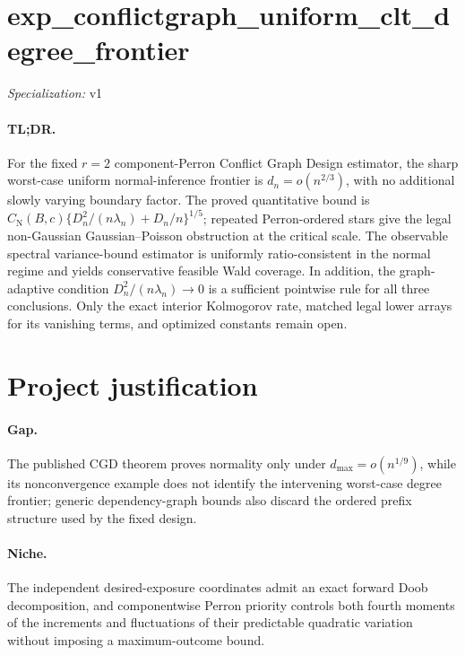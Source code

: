 \documentclass{article}
\begin{document}
\sloppy

\section*{exp\_\allowbreak{}conflictgraph\_\allowbreak{}uniform\_\allowbreak{}clt\_\allowbreak{}degree\_\allowbreak{}frontier}

\noindent\textit{Specialization:} v1\par

\paragraph{TL;DR.} For the fixed \(r=2\) component-Perron Conflict Graph Design estimator, the sharp worst-case uniform normal-inference frontier is \(d_n=o(n^{2/3})\), with no additional slowly varying boundary factor. The proved quantitative bound is \(C_{\mathrm N}(B,c)\{D_n^2/(n\lambda_n)+D_n/n\}^{1/5}\); repeated Perron-ordered stars give the legal non-Gaussian Gaussian--Poisson obstruction at the critical scale. The observable spectral variance-bound estimator is uniformly ratio-consistent in the normal regime and yields conservative feasible Wald coverage. In addition, the graph-adaptive condition \(D_n^2/(n\lambda_n)\to0\) is a sufficient pointwise rule for all three conclusions. Only the exact interior Kolmogorov rate, matched legal lower arrays for its vanishing terms, and optimized constants remain open.

\section{Project justification}

\paragraph{Gap.} The published CGD theorem proves normality only under \(d_{\max}=o(n^{1/9})\), while its nonconvergence example does not identify the intervening worst-case degree frontier; generic dependency-graph bounds also discard the ordered prefix structure used by the fixed design.

\paragraph{Niche.} The independent desired-exposure coordinates admit an exact forward Doob decomposition, and componentwise Perron priority controls both fourth moments of the increments and fluctuations of their predictable quadratic variation without imposing a maximum-outcome bound.
\end{document}
